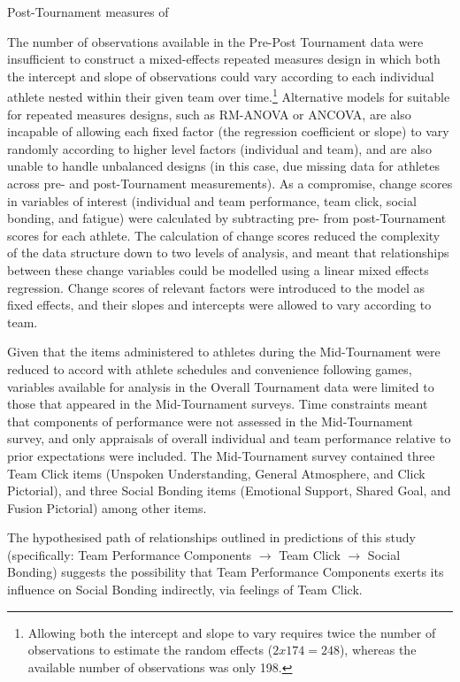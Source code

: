 \begin{CJK}{UTF8}{gbsn}
Post-Tournament measures of

 The number of observations available in the Pre-Post Tournament data were insufficient to construct a mixed-effects repeated measures design in which both the intercept and slope of observations could vary according to each individual athlete nested within their given team over time.\footnote{Allowing both the intercept and slope to vary requires twice the number of observations to estimate the random effects ($2x174 = 248$), whereas the available number of observations was only 198.}
 Alternative models for suitable for repeated measures designs, such as RM-ANOVA or ANCOVA, are also incapable of allowing each fixed factor (the regression coefficient or slope) to vary randomly according to higher level factors (individual and team), and are also unable to handle unbalanced designs (in this case, due missing data for athletes across pre- and post-Tournament measurements). As a compromise, change scores in variables of interest (individual and team performance, team click, social bonding, and fatigue) were calculated by subtracting pre- from post-Tournament scores for each athlete. The calculation of change scores reduced the complexity of the data structure down to two levels of analysis, and meant that relationships between these change variables could be modelled using a linear mixed effects regression. Change scores of relevant factors were introduced to the model as fixed effects, and their slopes and intercepts were allowed to vary according to team.

Given that the items administered to athletes during the Mid-Tournament were reduced to accord with athlete schedules and convenience following games, variables available for analysis in the Overall Tournament data were limited to those that appeared in the Mid-Tournament surveys.  Time constraints meant that components of performance were not assessed in the Mid-Tournament survey, and only appraisals of overall individual and team performance relative to prior expectations were included.  The Mid-Tournament survey contained three Team Click items (Unspoken Understanding, General Atmosphere, and Click Pictorial), and three Social Bonding items (Emotional Support, Shared Goal, and Fusion Pictorial) among other items.

The hypothesised path of relationships outlined in predictions of this study (specifically: Team Performance Components $\rightarrow$ Team Click $\rightarrow$ Social Bonding) suggests the possibility that Team Performance Components exerts its influence on Social Bonding indirectly, via feelings of Team Click.


\end{CJK}
